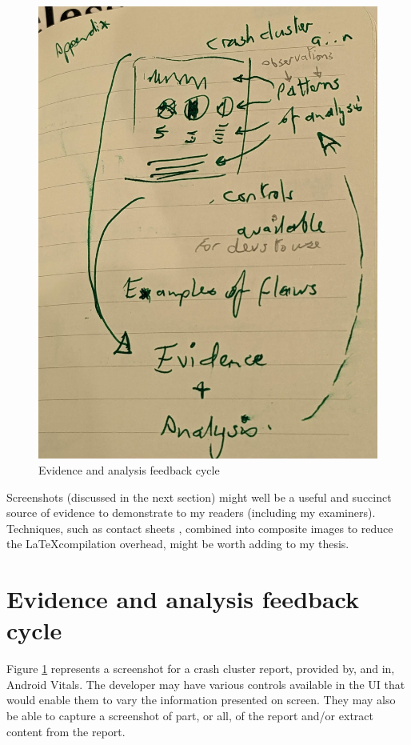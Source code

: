 \begin{figure}
    \centering
    \includegraphics{images/rough-sketches/evidence_and_analysis_cycle.jpeg}
    \caption{Evidence and analysis feedback cycle}
    \label{fig:evidence_and_analysis_cycle}
\end{figure}
Screenshots (discussed in the next section) might well be a useful and succinct source of evidence to demonstrate to my readers (including my examiners). Techniques, such as contact sheets , combined into composite images to reduce the \LaTeX compilation overhead, might be worth adding to my thesis. 


\section{Evidence and analysis feedback cycle}
Figure \ref{fig:evidence_and_analysis_cycle} represents a screenshot for a crash cluster report, provided by, and in, Android Vitals. The developer may have various controls available in the UI that would enable them to vary the information presented on screen. They may also be able to capture a screenshot of part, or all, of the report and/or extract content from the report.

